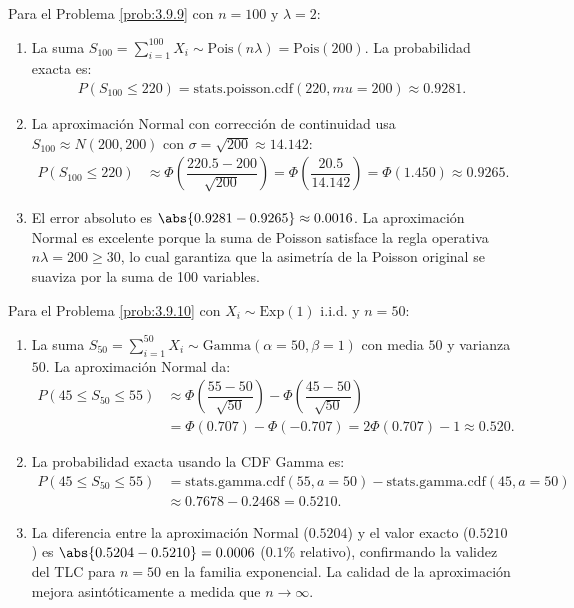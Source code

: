\begin{solucion}
	\label{sol:3.9.9}
	Para el Problema \ref{prob:3.9.9} con $n = 100$ y $\lambda = 2$:
	\begin{enumerate}
		\item La suma $S_{100} = \sum_{i=1}^{100} X_{i} \sim \text{Pois}(n\lambda) = \text{Pois}(200)$. La probabilidad exacta es:
		\begin{align*}
			P(S_{100} \le 220) = \text{stats.poisson.cdf}(220, mu=200) \approx 0.9281.
		\end{align*}
		\item La aproximación Normal con corrección de continuidad usa $S_{100} \approx N(200, 200)$ con $\sigma = \sqrt{200} \approx 14.142$:
		\begin{align*}
			P(S_{100} \le 220) &\approx \Phi\left(\dfrac{220.5 - 200}{\sqrt{200}}\right) = \Phi\left(\dfrac{20.5}{14.142}\right) = \Phi(1.450) \approx 0.9265.
		\end{align*}
		\item El error absoluto es $\abs{0.9281 - 0.9265} \approx 0.0016$. La aproximación Normal es excelente porque la suma de Poisson satisface la regla operativa $n\lambda = 200 \ge 30$, lo cual garantiza que la asimetría de la Poisson original se suaviza por la suma de 100 variables.
	\end{enumerate}
\end{solucion}

\begin{solucion}
	\label{sol:3.9.10}
	Para el Problema \ref{prob:3.9.10} con $X_{i} \sim \text{Exp}(1)$ i.i.d. y $n = 50$:
	\begin{enumerate}
		\item La suma $S_{50} = \sum_{i=1}^{50} X_{i} \sim \text{Gamma}(\alpha = 50, \beta = 1)$ con media $50$ y varianza $50$. La aproximación Normal da:
		\begin{align*}
			P(45 \le S_{50} \le 55) &\approx \Phi\left(\dfrac{55 - 50}{\sqrt{50}}\right) - \Phi\left(\dfrac{45 - 50}{\sqrt{50}}\right) \\
			&= \Phi(0.707) - \Phi(-0.707) = 2\Phi(0.707) - 1 \approx 0.520.
		\end{align*}
		\item La probabilidad exacta usando la CDF Gamma es:
		\begin{align*}
			P(45 \le S_{50} \le 55) &= \text{stats.gamma.cdf}(55, a=50) - \text{stats.gamma.cdf}(45, a=50) \\
			&\approx 0.7678 - 0.2468 = 0.5210.
		\end{align*}
		\item La diferencia entre la aproximación Normal ($0.5204$) y el valor exacto ($0.5210$) es $\abs{0.5204 - 0.5210} = 0.0006$ ($0.1\%$ relativo), confirmando la validez del TLC para $n = 50$ en la familia exponencial. La calidad de la aproximación mejora asintóticamente a medida que $n \to \infty$. \qedhere
	\end{enumerate}
\end{solucion}

